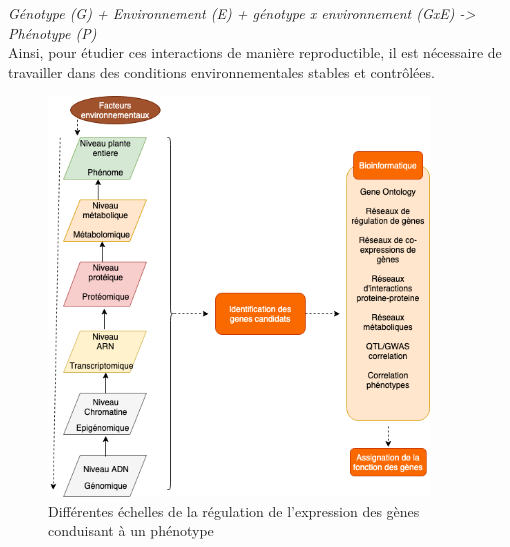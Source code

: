  \textit{Génotype (G) + Environnement (E) +  génotype x environnement (GxE) -> Phénotype (P)}\\
 
 Ainsi, pour étudier ces interactions de manière reproductible, il est nécessaire de travailler dans des conditions environnementales stables et contrôlées. 
 \\
 
\begin{figure}[!ht]
    \centering
    \includegraphics[width=0.9\textwidth]{hdr_manuscript/Figures/multi-echelles.png}
    \caption[Différentes échelles de la régulation de l’expression  des gènes conduisant à un phénotype]{Différentes échelles de la régulation de l’expression  des gènes conduisant à un phénotype \cite{ChenCAK14}}
    \label{fig:geno-pheno}
\end{figure}

